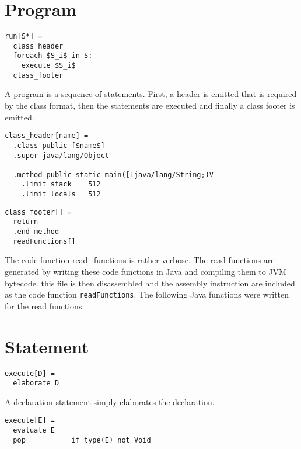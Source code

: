 \lstset{
mathescape = true
}

\section{Program}
\begin{lstlisting}
run[S*] =
  class_header
  foreach $S_i$ in S:
    execute $S_i$
  class_footer
\end{lstlisting}  
A program is a sequence of statements. First, a header is emitted that is required by the class format, then the statements are executed and finally a class footer is emitted.

\begin{lstlisting}
class_header[name] =
  .class public [$name$]
  .super java/lang/Object

  .method public static main([Ljava/lang/String;)V
    .limit stack 	512
    .limit locals 	512
\end{lstlisting}


\begin{lstlisting}
class_footer[] =
  return
  .end method
  readFunctions[]
\end{lstlisting}

The code function read_functions is rather verbose. The read functions are generated by writing these code functions in Java and compiling them to JVM bytecode. this file is then disassembled and the assembly instruction are included as the code function \texttt{readFunctions}. The following Java functions were written for the read functions:




\section{Statement}
\begin{lstlisting}
execute[D] = 
  elaborate D
\end{lstlisting}

A declaration statement simply elaborates the declaration.

\begin{lstlisting}
execute[E] = 
  evaluate E
  pop			if type(E) not Void
\end{lstlisting}

